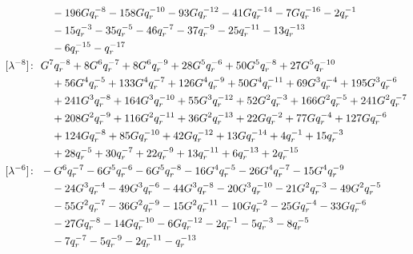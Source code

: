 \begin{align*}
& \quad -196 G q_r^{-8} -158 G q_r^{-10} -93 G q_r^{-12} -41 G q_r^{-14} -7 G q_r^{-16} -2 q_r^{-1} \\
& \quad -15 q_r^{-3} -35 q_r^{-5} -46 q_r^{-7} -37 q_r^{-9} -25 q_r^{-11} -13 q_r^{-13} \\
& \quad -6 q_r^{-15} -q_r^{-17} \\
[\lambda^{-8}]\colon\ & G^{7} q_r^{-8} +8 G^{6} q_r^{-7} +8 G^{6} q_r^{-9} +28 G^{5} q_r^{-6} +50 G^{5} q_r^{-8} +27 G^{5} q_r^{-10} \\
& \quad +56 G^{4} q_r^{-5} +133 G^{4} q_r^{-7} +126 G^{4} q_r^{-9} +50 G^{4} q_r^{-11} +69 G^{3} q_r^{-4} +195 G^{3} q_r^{-6} \\
& \quad +241 G^{3} q_r^{-8} +164 G^{3} q_r^{-10} +55 G^{3} q_r^{-12} +52 G^{2} q_r^{-3} +166 G^{2} q_r^{-5} +241 G^{2} q_r^{-7} \\
& \quad +208 G^{2} q_r^{-9} +116 G^{2} q_r^{-11} +36 G^{2} q_r^{-13} +22 G q_r^{-2} +77 G q_r^{-4} +127 G q_r^{-6} \\
& \quad +124 G q_r^{-8} +85 G q_r^{-10} +42 G q_r^{-12} +13 G q_r^{-14} +4 q_r^{-1} +15 q_r^{-3} \\
& \quad +28 q_r^{-5} +30 q_r^{-7} +22 q_r^{-9} +13 q_r^{-11} +6 q_r^{-13} +2 q_r^{-15} \\
[\lambda^{-6}]\colon\ & -G^{6} q_r^{-7} -6 G^{5} q_r^{-6} -6 G^{5} q_r^{-8} -16 G^{4} q_r^{-5} -26 G^{4} q_r^{-7} -15 G^{4} q_r^{-9} \\
& \quad -24 G^{3} q_r^{-4} -49 G^{3} q_r^{-6} -44 G^{3} q_r^{-8} -20 G^{3} q_r^{-10} -21 G^{2} q_r^{-3} -49 G^{2} q_r^{-5} \\
& \quad -55 G^{2} q_r^{-7} -36 G^{2} q_r^{-9} -15 G^{2} q_r^{-11} -10 G q_r^{-2} -25 G q_r^{-4} -33 G q_r^{-6} \\
& \quad -27 G q_r^{-8} -14 G q_r^{-10} -6 G q_r^{-12} -2 q_r^{-1} -5 q_r^{-3} -8 q_r^{-5} \\
& \quad -7 q_r^{-7} -5 q_r^{-9} -2 q_r^{-11} -q_r^{-13}
\end{align*}

